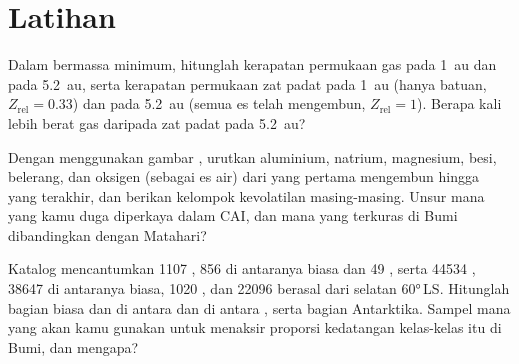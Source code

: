 \section{Latihan}

\begin{exercise}[$\star$]\label{exo:b2:planet-formation-meteorites:1}
Dalam  bermassa minimum, hitunglah kerapatan permukaan gas pada
\qty{1}{au} dan pada \qty{5.2}{au}, serta kerapatan permukaan zat padat pada
\qty{1}{au} (hanya batuan, $Z_{\mathrm{rel}} = 0.33$) dan pada \qty{5.2}{au} (semua es
telah mengembun, $Z_{\mathrm{rel}} = 1$). Berapa kali lebih berat gas daripada zat padat
pada \qty{5.2}{au}?
\end{exercise}

\begin{exercise}[$\star$]\label{exo:b2:planet-formation-meteorites:2}
Dengan menggunakan gambar , urutkan aluminium, natrium,
magnesium, besi, belerang, dan oksigen (sebagai es air) dari yang pertama mengembun hingga
yang terakhir, dan berikan kelompok kevolatilan masing-masing. Unsur mana yang kamu duga
diperkaya dalam CAI, dan mana yang terkuras di Bumi dibandingkan dengan Matahari?
\end{exercise}

\begin{exercise}[$\star$]\label{exo:b2:planet-formation-meteorites:3}
Katalog mencantumkan \num{1107} , 856 di antaranya  biasa dan
49 , serta \num{44534} , \num{38647} di antaranya  biasa,
\num{1020} , dan \num{22096} berasal dari selatan \ang{60}\,LS. Hitunglah
bagian  biasa dan  di antara  dan di antara ,
serta bagian  Antarktika. Sampel mana yang akan kamu gunakan untuk menaksir
proporsi kedatangan kelas-kelas itu di Bumi, dan mengapa?
\end{exercise}

